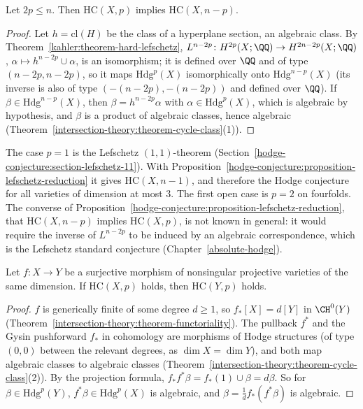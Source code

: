 \begin{proposition}\label{hodge-conjecture:proposition-lefschetz-reduction}
Let $2p \leq n$. Then $\mathrm{HC}(X, p)$ implies $\mathrm{HC}(X, n - p)$.
\end{proposition}

\begin{proof}
Let $h = \mathrm{cl}(H)$ be the class of a hyperplane section, an algebraic class. By Theorem~\ref{kahler:theorem-hard-lefschetz}, $L^{n-2p} \colon H^{2p}(X; \QQ) \to H^{2n-2p}(X; \QQ)$,
$\alpha \mapsto h^{n-2p} \cup \alpha$, is an isomorphism; it is defined over $\QQ$ and of type $(n-2p, n-2p)$, so it maps $\mathrm{Hdg}^p(X)$ isomorphically onto $\mathrm{Hdg}^{n-p}(X)$ (its inverse is
also of type $(-(n-2p), -(n-2p))$ and defined over $\QQ$). If $\beta \in \mathrm{Hdg}^{n-p}(X)$, then $\beta = h^{n-2p}\alpha$ with $\alpha \in \mathrm{Hdg}^p(X)$, which is algebraic by hypothesis, and
$\beta$ is a product of algebraic classes, hence algebraic (Theorem~\ref{intersection-theory:theorem-cycle-class}(1)).
\end{proof}

\begin{remark}\label{hodge-conjecture:remark-small-dimension}
The case $p = 1$ is the Lefschetz $(1,1)$-theorem (Section~\ref{hodge-conjecture:section-lefschetz-11}). With Proposition~\ref{hodge-conjecture:proposition-lefschetz-reduction} it gives $\mathrm{HC}(X, n - 1)$, and
therefore the Hodge conjecture for all varieties of dimension at most $3$. The first open case is $p = 2$ on fourfolds. The converse of
Proposition~\ref{hodge-conjecture:proposition-lefschetz-reduction}, that $\mathrm{HC}(X, n-p)$ implies $\mathrm{HC}(X, p)$, is not known in general: it would require the inverse of $L^{n-2p}$ to be
induced by an algebraic correspondence, which is the Lefschetz standard conjecture (Chapter~\ref{absolute-hodge}).
\end{remark}

\begin{proposition}\label{hodge-conjecture:proposition-dominant-maps}
Let $f \colon X \to Y$ be a surjective morphism of nonsingular projective varieties of the same dimension. If $\mathrm{HC}(X, p)$ holds, then $\mathrm{HC}(Y, p)$ holds.
\end{proposition}

\begin{proof}
$f$ is generically finite of some degree $d \geq 1$, so $f_*[X] = d[Y]$ in $\CH^0(Y)$ (Theorem~\ref{intersection-theory:theorem-functoriality}). The pullback $f^*$ and the Gysin pushforward $f_*$ in
cohomology are morphisms of Hodge structures (of type $(0,0)$ between the relevant degrees, as $\dim X = \dim Y$), and both map algebraic classes to algebraic classes
(Theorem~\ref{intersection-theory:theorem-cycle-class}(2)). By the projection formula, $f_*f^*\beta = f_*(1) \cup \beta = d\beta$. So for $\beta \in \mathrm{Hdg}^p(Y)$, $f^*\beta \in \mathrm{Hdg}^p(X)$ is algebraic,
and $\beta = \frac1df_*(f^*\beta)$ is algebraic.
\end{proof}

